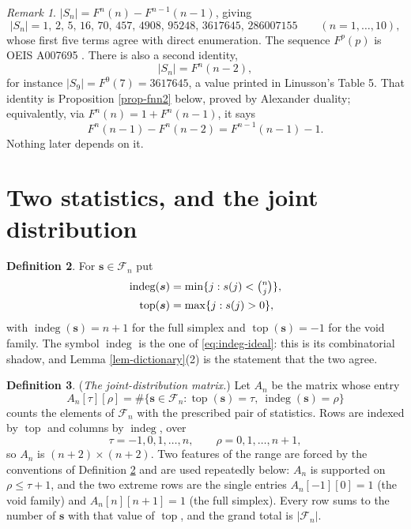 \documentclass[11pt, a4paper, abstract=yes]{scrartcl}
\theoremstyle{definition}
\newtheorem{definition}{Definition}
\theoremstyle{remark}
\newtheorem{remark}[definition]{Remark}
\theoremstyle{plain}
\newcommand{\vek}[1]{\boldsymbol{#1}}
\newcommand{\indeg}{\operatorname{indeg}}
\newcommand{\tp}{\operatorname{top}}
\begin{document}
\begin{remark}
\(|S_n|=F^n(n)-F^{n-1}(n-1)\), giving
\begin{equation}\label{eq:auto-10}
  \lvert S_n\rvert = 1,\,2,\,5,\,16,\,70,\,457,\,4908,\,95248,\,3617645,\,286007155
  \qquad(n=1,\dots,10),
\end{equation}
whose first five terms agree with direct enumeration. The sequence \(F^p(p)\) is
OEIS A007695 \autocite{OEIS}. There is also a second identity,
\begin{equation}\label{eq:Sn-as-Fnn2}
  \lvert S_n\rvert=F^n(n-2),
\end{equation}
for instance \(|S_9|=F^9(7)=3617645\), a value printed in Linusson's Table 5. That identity is
Proposition \ref{prop-fnn2} below, proved by Alexander duality; equivalently, via
\(F^n(n)=1+F^n(n-1)\), it says
\begin{equation}\label{eq:Fnn2-equivalent}
  F^n(n-1)-F^n(n-2)=F^{n-1}(n-1)-1 .
\end{equation}
Nothing later depends on it.
\label{obs-fnn2}
\end{remark}
\section{Two statistics, and the joint distribution}
\label{sec-statistics}
\begin{definition}
For \(\vek s\in\mathcal F_n\) put
\begin{align}
  \indeg(\vek s) &= \min\lbrace j:s(j)<\tbinom nj\rbrace,\label{eq:def-indeg}\\
  \tp(\vek s) &= \max\lbrace j:s(j)>0\rbrace,\label{eq:def-top}
\end{align}
with \(\indeg(\vek s)=n+1\) for the full simplex and \(\tp(\vek s)=-1\) for the void family. The
symbol \(\indeg\) is the one of \eqref{eq:indeg-ideal}: this is its combinatorial shadow, and
Lemma \ref{lem-dictionary}(2) is the statement that the two agree.
\label{def-stats}
\end{definition}

\begin{definition}
(\emph{The joint-distribution matrix.}) Let \(A_n\) be the matrix whose entry
\begin{equation}\label{eq:def-A}
  A_n[\tau][\rho]=\#\bigl\lbrace \vek s\in\mathcal F_n:\tp(\vek s)=\tau,\ \indeg(\vek s)=\rho\bigr\rbrace
\end{equation}
counts the elements of \(\mathcal F_n\) with the prescribed pair of statistics. Rows are indexed by
\(\tp\) and columns by \(\indeg\), over
\begin{equation}\label{eq:def-A-range}
  \tau=-1,0,1,\dots,n,\qquad \rho=0,1,\dots,n+1 ,
\end{equation}
so \(A_n\) is \((n+2)\times(n+2)\). Two features of the range are forced by the conventions of
Definition \ref{def-stats} and are used repeatedly below: \(A_n\) is supported on \(\rho\le\tau+1\), and
the two extreme rows are the single entries \(A_n[-1][0]=1\) (the void family) and \(A_n[n][n+1]=1\)
(the full simplex). Every row sums to the number of \(\vek s\) with that value of \(\tp\), and the
grand total is \(\lvert\mathcal F_n\rvert\).
\label{def-A}
\end{definition}
\end{document}
